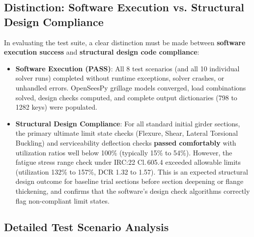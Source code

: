 \documentclass[11pt,a4paper]{article}
\begin{document}
\subsection{Distinction: Software Execution vs. Structural Design Compliance}
In evaluating the test suite, a clear distinction must be made between \textbf{software execution success} and \textbf{structural design code compliance}:
\begin{itemize}
    \item \textbf{Software Execution (PASS)}: All 8 test scenarios (and all 10 individual solver runs) completed without runtime exceptions, solver crashes, or unhandled errors. OpenSeesPy grillage models converged, load combinations solved, design checks computed, and complete output dictionaries (798 to 1282 keys) were populated.
    \item \textbf{Structural Design Compliance}: For all standard initial girder sections, the primary ultimate limit state checks (Flexure, Shear, Lateral Torsional Buckling) and serviceability deflection checks \textbf{passed comfortably} with utilization ratios well below 100\% (typically 15\% to 54\%). However, the fatigue stress range check under IRC:22 Cl.\,605.4 exceeded allowable limits (utilization 132\% to 157\%, DCR 1.32 to 1.57). This is an expected structural design outcome for baseline trial sections before section deepening or flange thickening, and confirms that the software's design check algorithms correctly flag non-compliant limit states.
\end{itemize}

\subsection{Detailed Test Scenario Analysis}
\end{document}
